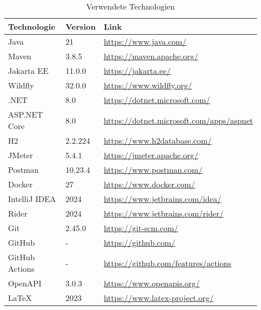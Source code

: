 \begin{table}[!h]
    \centering
    \begin{tabular}{|l|l|l|}
        \hline
        \textbf{Technologie} & \textbf{Version} & \textbf{Link} \\
        \hline
        
        Java & 21 & \url{https://www.java.com/} \\
        Maven & 3.8.5 & \url{https://maven.apache.org/} \\
        Jakarta EE & 11.0.0  & \url{https://jakarta.ee/} \\
        Wildfly & 32.0.0 & \url{https://www.wildfly.org/} \\
        \hline
        
        .NET & 8.0 & \url{https://dotnet.microsoft.com/} \\
        ASP.NET Core & 8.0 & \url{https://dotnet.microsoft.com/apps/aspnet} \\
        \hline
        
        H2 & 2.2.224 & \url{https://www.h2database.com/} \\
        \hline
        
        JMeter & 5.4.1 & \url{https://jmeter.apache.org/} \\
        Postman & 10.23.4 & \url{https://www.postman.com/} \\
        \hline
        
        Docker & 27 & \url{https://www.docker.com/} \\
        IntelliJ IDEA & 2024 & \url{https://www.jetbrains.com/idea/} \\
        Rider & 2024 & \url{https://www.jetbrains.com/rider/} \\
        \hline

        Git & 2.45.0 & \url{https://git-scm.com/} \\
        GitHub & - & \url{https://github.com/} \\
        GitHub Actions & - & \url{https://github.com/features/actions} \\
        \hline

        OpenAPI & 3.0.3 & \url{https://www.openapis.org/} \\
        LaTeX & 2023 & \url{https://www.latex-project.org/} \\
        \hline
    \end{tabular}

    \caption{Verwendete Technologien}
    \label{tab:technologies}
\end{table}
